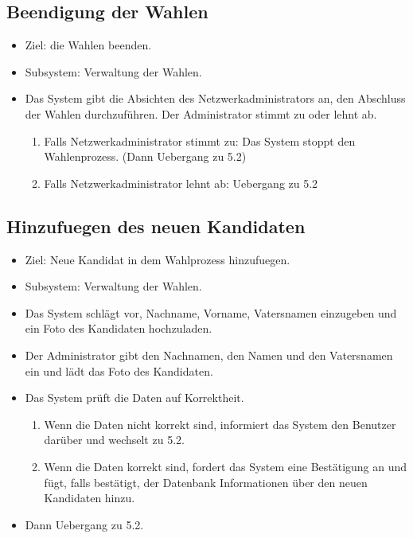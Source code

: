 \documentclass[parskip=full,11pt,twoside]{scrartcl}
\begin{document}
\subsection{Beendigung der Wahlen}
\begin{itemize}
	\item Ziel: die Wahlen beenden.
	\item Subsystem: Verwaltung der Wahlen.
      \item Das System gibt die Absichten des Netzwerkadministrators an, den Abschluss der Wahlen durchzuführen.
Der Administrator stimmt zu oder lehnt ab.
	\begin{enumerate}
		\item Falls Netzwerkadministrator stimmt zu: Das System stoppt den Wahlenprozess. (Dann Uebergang 
zu 5.2)
		\item Falls Netzwerkadministrator lehnt ab: Uebergang zu 5.2
	\end{enumerate}
\end{itemize}

\subsection{Hinzufuegen des neuen Kandidaten}
\begin{itemize}
	\item Ziel: Neue Kandidat in dem Wahlprozess hinzufuegen.
	\item Subsystem: Verwaltung der Wahlen.
	\item Das System schlägt vor, Nachname, Vorname, Vatersnamen einzugeben und ein Foto des Kandidaten hochzuladen.
	\item Der Administrator gibt den Nachnamen, den Namen und den Vatersnamen ein und lädt das Foto des Kandidaten.
	\item Das System prüft die Daten auf Korrektheit.
	\begin{enumerate} 
		\item Wenn die Daten nicht korrekt sind, informiert das System den Benutzer darüber und wechselt zu 5.2.
		\item Wenn die Daten korrekt sind, fordert das System eine Bestätigung an und fügt, falls bestätigt, der Datenbank Informationen über den neuen Kandidaten hinzu. 
	\end{enumerate}
	\item Dann Uebergang zu 5.2.
\end{itemize}
\end{document}
